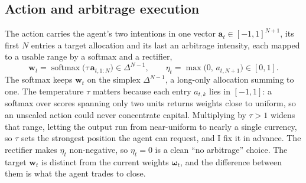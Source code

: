 \documentclass[12pt,a4paper]{article}
\begin{document}
\subsection{Action and arbitrage execution}

The action carries the agent's two intentions in one vector $\mathbf{a}_t\in[-1,1]^{N+1}$, its
first $N$ entries a target allocation and its last an arbitrage intensity, each mapped to a
usable range by a softmax and a rectifier,
\begin{equation}
\mathbf{w}_t=\operatorname{softmax}\!\big(\tau\,\mathbf{a}_{t,1:N}\big)\in\Delta^{N-1},\qquad
\eta_t=\max\!\big(0,\,a_{t,N+1}\big)\in[0,1].
\label{eq:action}
\end{equation}
The softmax keeps $\mathbf{w}_t$ on the simplex $\Delta^{N-1}$, a long-only allocation summing to
one. The temperature $\tau$ matters because each entry $a_{t,k}$ lies in $[-1,1]$: a softmax over
scores spanning only two units returns weights close to uniform, so an unscaled action could
never concentrate capital. Multiplying by $\tau>1$ widens that range, letting the output run from
near-uniform to nearly a single currency, so $\tau$ sets the strongest position the agent can
request, and I fix it in advance. The rectifier makes $\eta_t$ non-negative, so $\eta_t=0$ is a
clean ``no arbitrage'' choice. The target $\mathbf{w}_t$ is distinct from the current weights
$\boldsymbol{\omega}_t$, and the difference between them is what the agent trades to close.
\end{document}
